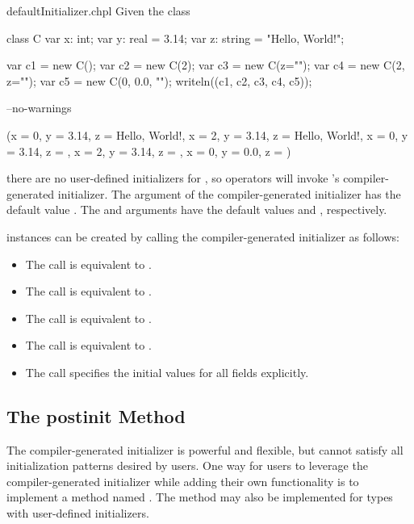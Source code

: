 \begin{chapelexample}{defaultInitializer.chpl}
Given the class
\begin{chapel}
class C {
  var x: int;
  var y: real = 3.14;
  var z: string = "Hello, World!";
}
\end{chapel}
\begin{chapelpost}
var c1 = new C();
var c2 = new C(2);
var c3 = new C(z="");
var c4 = new C(2, z="");
var c5 = new C(0, 0.0, "");
writeln((c1, c2, c3, c4, c5));
\end{chapelpost}
\begin{chapelcompopts}
--no-warnings
\end{chapelcompopts}
\begin{chapeloutput}
({x = 0, y = 3.14, z = Hello, World!}, {x = 2, y = 3.14, z = Hello, World!}, {x = 0, y = 3.14, z = }, {x = 2, y = 3.14, z = }, {x = 0, y = 0.0, z = })
\end{chapeloutput}
there are no user-defined initializers for , so  operators
will invoke 's compiler-generated initializer. The  argument
of the compiler-generated initializer has the default value .
The  and  arguments have the default values  and
, respectively.

 instances can be created by calling the compiler-generated initializer as follows:
\begin{itemize}
\item The call  is equivalent to .
\item The call  is equivalent to .
\item The call  is equivalent to .
\item The call  is equivalent to .
\item The call  specifies the initial values for all fields explicitly.
\end{itemize}
\end{chapelexample}

\subsection{The postinit Method}
\label{The_postinit_Method}

The compiler-generated initializer is powerful and flexible, but cannot satisfy
all initialization patterns desired by users. One way for users to leverage
the compiler-generated initializer while adding their own functionality is to
implement a method named . The  method may also
be implemented for types with user-defined initializers.

